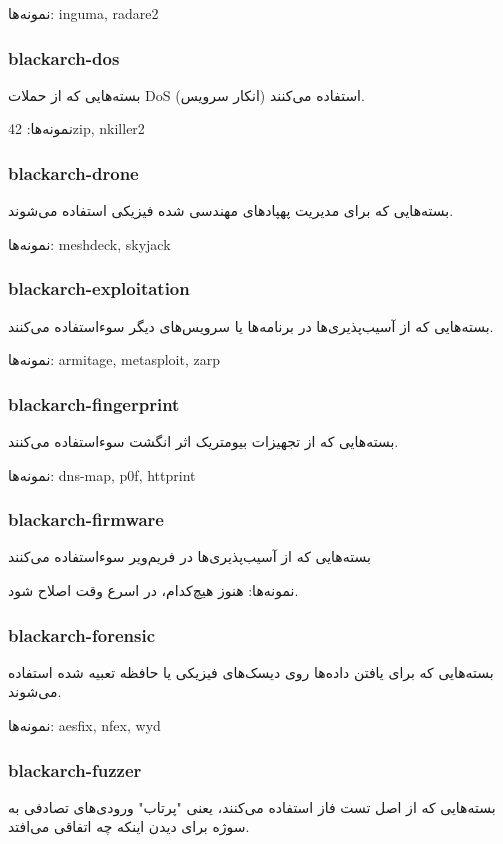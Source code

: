 \documentclass[a4paper, oneside, 11pt]{book}
\begin{document}
نمونه‌ها: inguma, radare2

\subsubsection{blackarch-dos}
بسته‌هایی که از حملات DoS (انکار سرویس) استفاده می‌کنند.

نمونه‌ها: 42zip, nkiller2

\subsubsection{blackarch-drone}
بسته‌هایی که برای مدیریت پهپادهای
مهندسی شده فیزیکی استفاده می‌شوند.

نمونه‌ها: meshdeck, skyjack

\subsubsection{blackarch-exploitation}
بسته‌هایی که از آسیب‌پذیری‌ها در برنامه‌ها یا سرویس‌های دیگر سوءاستفاده می‌کنند.

نمونه‌ها: armitage, metasploit, zarp

\subsubsection{blackarch-fingerprint}
بسته‌هایی که از تجهیزات بیومتریک اثر انگشت سوءاستفاده می‌کنند.

نمونه‌ها: dns-map, p0f, httprint

\subsubsection{blackarch-firmware}
بسته‌هایی که از آسیب‌پذیری‌ها در فریم‌ویر سوءاستفاده می‌کنند

نمونه‌ها: هنوز هیچ‌کدام، در اسرع وقت اصلاح شود.

\subsubsection{blackarch-forensic}
بسته‌هایی که برای یافتن داده‌ها روی دیسک‌های فیزیکی یا حافظه تعبیه شده استفاده می‌شوند.

نمونه‌ها: aesfix, nfex, wyd

\subsubsection{blackarch-fuzzer}
بسته‌هایی که از اصل تست فاز استفاده می‌کنند، یعنی
"پرتاب" ورودی‌های تصادفی به سوژه برای دیدن اینکه چه اتفاقی می‌افتد.
\end{document}
